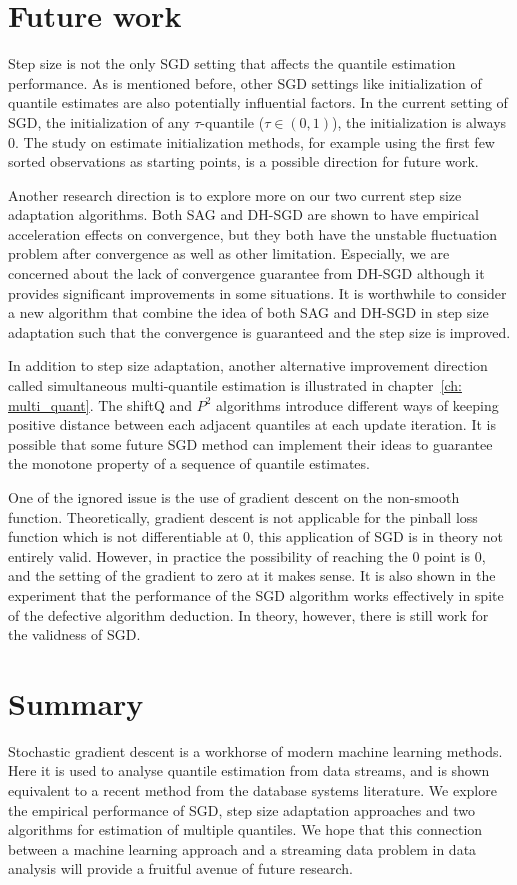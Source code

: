 \section{Future work}

Step size is not the only SGD setting that affects the quantile estimation performance. As is mentioned before, other SGD settings like initialization of quantile estimates are also potentially influential factors. In the current setting of SGD, the initialization of any $\tau$-quantile ($\tau \in (0,1)$), the initialization is always $0$. The study on estimate initialization methods, for example using the first few sorted observations as starting points, is a possible direction for future work.

Another research direction is to explore more on our two current step size adaptation algorithms. Both SAG and DH-SGD are shown to have empirical acceleration effects on convergence, but they both have the unstable fluctuation problem after convergence as well as other limitation. Especially, we are concerned about the lack of convergence guarantee from DH-SGD although it provides significant improvements in some situations. It is worthwhile to consider a new algorithm that combine the idea of both SAG and DH-SGD in step size adaptation such that the convergence is guaranteed and the step size is improved.

In addition to step size adaptation, another alternative improvement direction called simultaneous multi-quantile estimation is illustrated in chapter~\ref{ch: multi_quant}. 
The shiftQ and $P^2$ algorithms introduce different ways of keeping positive distance between each adjacent quantiles at each update iteration. It is possible that some future SGD method can implement their ideas to guarantee the monotone property of a sequence of quantile estimates.

One of the ignored issue is the use of gradient descent on the non-smooth function. Theoretically, gradient descent is not applicable for the pinball loss function which is not differentiable at $0$, this application of SGD is in theory not entirely valid. However, in practice the possibility of reaching the $0$ point is $0$, and the setting of the gradient to zero at it makes sense. It is also shown in the experiment that the performance of the SGD algorithm works effectively in spite of the defective algorithm deduction. In theory, however, there is still work for the validness of SGD.


\section{Summary}
Stochastic gradient descent is a workhorse of modern machine learning methods. Here it is used to analyse quantile estimation from data streams, and is shown equivalent to a recent method from the database systems literature. We explore the empirical performance of SGD, step size adaptation approaches and two algorithms for estimation of multiple quantiles. We hope that this connection between a machine learning approach and a streaming data problem in data analysis will provide a fruitful avenue of future research.